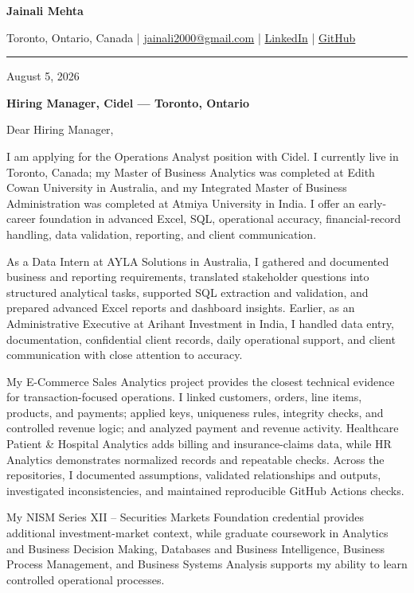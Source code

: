 \documentclass[letterpaper,10pt]{article}
\begin{document}
\begin{center}
  {\fontsize{17}{19}\selectfont\textbf{Jainali Mehta}}\par\vspace{2pt}
  \small Toronto, Ontario, Canada \;|\;
  \href{mailto:jainali2000@gmail.com}{jainali2000@gmail.com} \;|\;
  \href{https://www.linkedin.com/in/jainali-mehta}{LinkedIn} \;|\;
  \href{https://github.com/jainalimehta}{GitHub}
\end{center}
\vspace{-5pt}
\noindent\rule{\textwidth}{0.4pt}

August 5, 2026

\textbf{Hiring Manager, Cidel --- Toronto, Ontario}

Dear Hiring Manager,

I am applying for the Operations Analyst position with Cidel. I currently live in Toronto, Canada; my Master of Business Analytics was completed at Edith Cowan University in Australia, and my Integrated Master of Business Administration was completed at Atmiya University in India. I offer an early-career foundation in advanced Excel, SQL, operational accuracy, financial-record handling, data validation, reporting, and client communication.

As a Data Intern at AYLA Solutions in Australia, I gathered and documented business and reporting requirements, translated stakeholder questions into structured analytical tasks, supported SQL extraction and validation, and prepared advanced Excel reports and dashboard insights. Earlier, as an Administrative Executive at Arihant Investment in India, I handled data entry, documentation, confidential client records, daily operational support, and client communication with close attention to accuracy.

My E-Commerce Sales Analytics project provides the closest technical evidence for transaction-focused operations. I linked customers, orders, line items, products, and payments; applied keys, uniqueness rules, integrity checks, and controlled revenue logic; and analyzed payment and revenue activity. Healthcare Patient \& Hospital Analytics adds billing and insurance-claims data, while HR Analytics demonstrates normalized records and repeatable checks. Across the repositories, I documented assumptions, validated relationships and outputs, investigated inconsistencies, and maintained reproducible GitHub Actions checks.

My NISM Series XII -- Securities Markets Foundation credential provides additional investment-market context, while graduate coursework in Analytics and Business Decision Making, Databases and Business Intelligence, Business Process Management, and Business Systems Analysis supports my ability to learn controlled operational processes.
\end{document}
